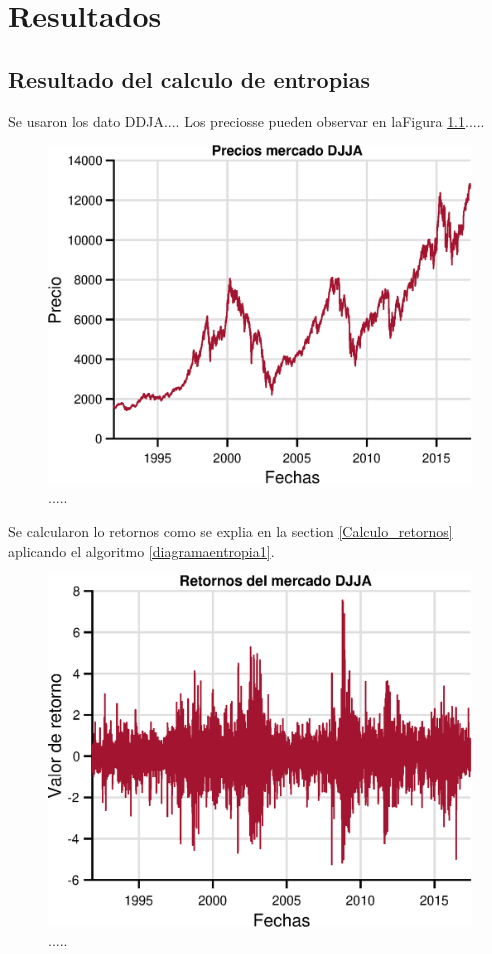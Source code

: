 %
\chapter{Resultados}
\label{Resultados}




\section{Resultado del calculo de entropias}

Se usaron los dato DDJA....
Los preciosse pueden observar en laFigura \ref{precioseps}.....


\begin{figure}
	\centering
	\includegraphics[width=0.7\linewidth]{figures/precioseps}
	\caption{.....}
	\label{precioseps}
\end{figure}

Se calcularon lo retornos como se explia en la section \ref{Calculo_retornos} aplicando el algoritmo \ref{diagramaentropia1}.


\begin{figure}
	\centering
	\includegraphics[width=0.7\linewidth]{figures/onlyreturnseps}
	\caption{.....}
	\label{onlyreturnseps}
\end{figure}


